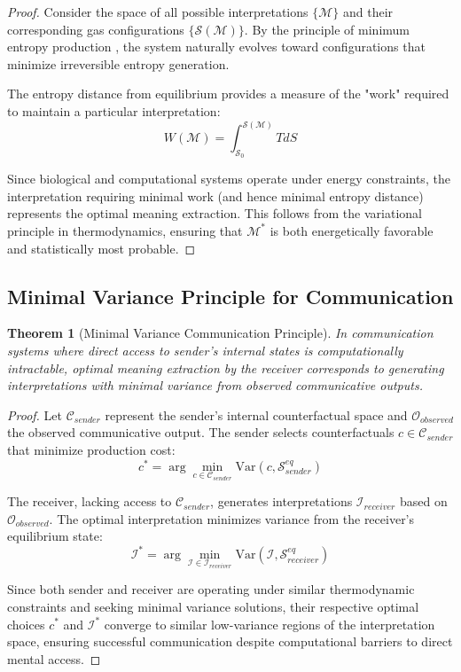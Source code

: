 \documentclass[11pt,a4paper]{article}
\newtheorem{theorem}{Theorem}[section]
\begin{document}
\begin{proof}
Consider the space of all possible interpretations $\{\mathcal{M}\}$ and their corresponding gas configurations $\{\mathcal{S}(\mathcal{M})\}$. By the principle of minimum entropy production \citep{prigogine1967thermodynamic}, the system naturally evolves toward configurations that minimize irreversible entropy generation. 

The entropy distance from equilibrium provides a measure of the "work" required to maintain a particular interpretation:
\begin{equation}
W(\mathcal{M}) = \int_{\mathcal{S}_0}^{\mathcal{S}(\mathcal{M})} T dS
\end{equation}

Since biological and computational systems operate under energy constraints, the interpretation requiring minimal work (and hence minimal entropy distance) represents the optimal meaning extraction. This follows from the variational principle in thermodynamics, ensuring that $\mathcal{M}^*$ is both energetically favorable and statistically most probable.
\end{proof}

\subsection{Minimal Variance Principle for Communication}

\begin{theorem}[Minimal Variance Communication Principle]
In communication systems where direct access to sender's internal states is computationally intractable, optimal meaning extraction by the receiver corresponds to generating interpretations with minimal variance from observed communicative outputs.
\end{theorem}

\begin{proof}
Let $\mathcal{C}_{sender}$ represent the sender's internal counterfactual space and $\mathcal{O}_{observed}$ the observed communicative output. The sender selects counterfactuals $c \in \mathcal{C}_{sender}$ that minimize production cost:
\begin{equation}
c^* = \arg\min_{c \in \mathcal{C}_{sender}} \text{Var}(c, \mathcal{S}_{sender}^{eq})
\end{equation}

The receiver, lacking access to $\mathcal{C}_{sender}$, generates interpretations $\mathcal{I}_{receiver}$ based on $\mathcal{O}_{observed}$. The optimal interpretation minimizes variance from the receiver's equilibrium state:
\begin{equation}
\mathcal{I}^* = \arg\min_{\mathcal{I} \in \mathcal{I}_{receiver}} \text{Var}(\mathcal{I}, \mathcal{S}_{receiver}^{eq})
\end{equation}

Since both sender and receiver are operating under similar thermodynamic constraints and seeking minimal variance solutions, their respective optimal choices $c^*$ and $\mathcal{I}^*$ converge to similar low-variance regions of the interpretation space, ensuring successful communication despite computational barriers to direct mental access.
\end{proof}
\end{document}
